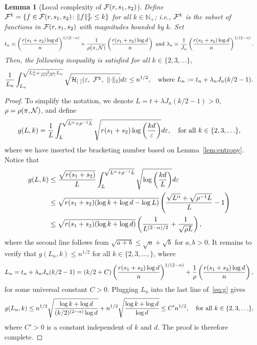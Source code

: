 \documentclass[11pt]{article}
\theoremstyle{plain}
\newtheorem{lem}{Lemma}
\theoremstyle{definition}
\begin{document}
\begin{lem}[Local complexity of $\mathcal{F}(r,s_1,s_2)$] \label{lem:metric}
Define $\mathcal{F}^{k}=\{f\in\mathcal{F}(r,s_1,s_2)\colon \lVert f\rVert_F^2\leq k\}$ for all $k\in\mathbb{N}_{+}$; i.e., $\mathcal{F}^k$ is the subset of functions in $\mathcal{F}(r,s_1,s_2)$ with magnitudes bounded by $k$. Set 
\begin{equation}\label{eq:specification}
t_n\asymp \left({r(s_1+s_2)\log d \over n } \right)^{1/(2-\alpha)} + {1\over \rho (\pi, \tN)}\left({r(s_1+s_2)\log d \over n } \right)\ \text{and}\ 
\lambda_n \asymp {1\over J_n}\left({r(s_1+s_2)\log d \over n }\right)^{1/(2-\alpha)}.
\end{equation}
Then, the following inequality is satisfied for all $k\in\{2,3,\ldots\}$,
\begin{equation}
{1\over L_n}\int^{\sqrt{L^\alpha_n+{1\over \rho (\pi, \tN)}L_n}}_{L_n} \sqrt{\tH_{[\ ]}(\varepsilon,\ \tF^{k},\ \vnormSize{}{\cdot}) }d\varepsilon \leq n^{1/2}, \quad \text{where}\ L_n:=t_n+\lambda_n J_n(k/2-1).
\end{equation}
\end{lem}
\begin{proof}
To simplify the notation, we denote $L=t+\lambda J_n (k/2-1)>0$, $\rho=\rho(\pi, \mathcal{N})$, and define
\begin{equation}\label{eq:complexity}
g(L, k)={1\over L}\int^{\sqrt{L^{\alpha}+\rho^{-1}L}}_{L} \sqrt{r(s_1+s_2)\log\left({kd\over \varepsilon}\right)}d\varepsilon,\quad \text{for all }k\in\{2,3,\ldots\},
\end{equation}
where we have inserted the bracketing number based on Lemma~\ref{lem:entropy}.  Notice that
\begin{align}\label{eq:g}
g(L,k)&\leq {\sqrt{r(s_1+s_2)}\over L}\int_{L}^{\sqrt{L^\alpha+\rho^{-1}L}}\sqrt{\log \left(kd \over L \right)}d\varepsilon\notag \\
&\leq \sqrt{r(s_1+s_2)(\log k+\log d - \log L)}\left({\sqrt{L^\alpha}+\sqrt{\rho^{-1}L} \over L }-1\right)\notag \\
&\leq  \sqrt{r(s_1+s_2)(\log k+\log d)}\left( {1\over L^{(2-\alpha)/2}}+{1\over \sqrt{\rho L}}\right),
\end{align}
where the second line follows from $\sqrt{a+b} \leq \sqrt{a}+\sqrt{b}$ for $a,b>0$.
It remains to verify that $g(L_n, k) \leq n^{1/2}$ for all $k\in\{2,3,\ldots,\}$, where 
\[
L_n=t_n+\lambda_nJ_n(k/2-1)=(k/2+C)\left( {r(s_1+s_2)\log d \over n}\right)^{1/(2-\alpha)}+{1\over \rho}\left( {r(s_1+s_2)\log d \over n}\right),
\]
for some universal constant $C>0$. Plugging $L_n$ into the last line of~\eqref{eq:g} gives
\[
g(L_n,k)\leq n^{1/2}\sqrt{\log k+\log d\over (k/2)^{(2-\alpha)} \log d}+n^{1/2}\sqrt{\log k+\log d \over \log d }\leq C'n^{1/2},\quad \text{for all }k\in\{2,3,\ldots\},
\]
where $C'>0$ is a constant independent of $k$ and $d$. The proof is therefore complete. 
\end{proof}
\end{document}
